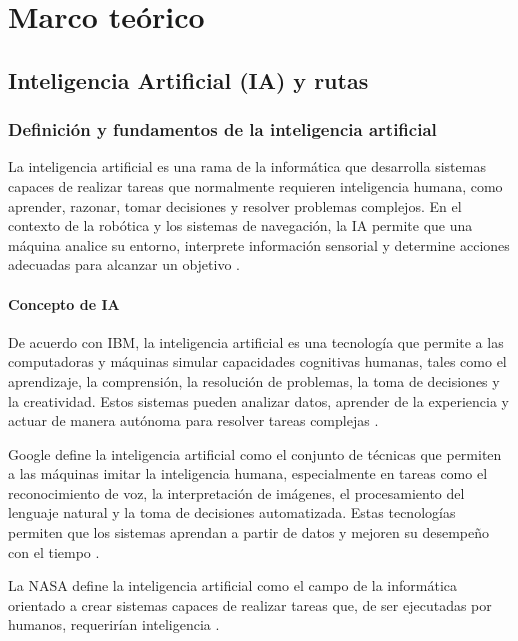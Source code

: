 
\chapter{Marco teórico}
\section{Inteligencia Artificial (IA) y rutas}
\subsection{Definición y fundamentos de la inteligencia artificial}

La inteligencia artificial es una rama de la informática que desarrolla sistemas capaces de realizar tareas que normalmente requieren inteligencia humana, como aprender, razonar, tomar decisiones y resolver problemas complejos. En el contexto de la robótica y los sistemas de navegación, la IA permite que una máquina analice su entorno, interprete información sensorial y determine acciones adecuadas para alcanzar un objetivo \cite{ganesan2025_common_ai_cheatsheet}.

\subsubsection{Concepto de IA}

De acuerdo con IBM, la inteligencia artificial es una tecnología que permite a las computadoras y máquinas simular capacidades cognitivas humanas, tales como el aprendizaje, la comprensión, la resolución de problemas, la toma de decisiones y la creatividad. Estos sistemas pueden analizar datos, aprender de la experiencia y actuar de manera autónoma para resolver tareas complejas \cite{ibm2025_ai_types}.

Google define la inteligencia artificial como el conjunto de técnicas que permiten a las máquinas imitar la inteligencia humana, especialmente en tareas como el reconocimiento de voz, la interpretación de imágenes, el procesamiento del lenguaje natural y la toma de decisiones automatizada. Estas tecnologías permiten que los sistemas aprendan a partir de datos y mejoren su desempeño con el tiempo \cite{googlecloud2025_que_es_ia}.

La NASA define la inteligencia artificial como el campo de la informática orientado a crear sistemas capaces de realizar tareas que, de ser ejecutadas por humanos, requerirían inteligencia \cite{NASA_ia}.

